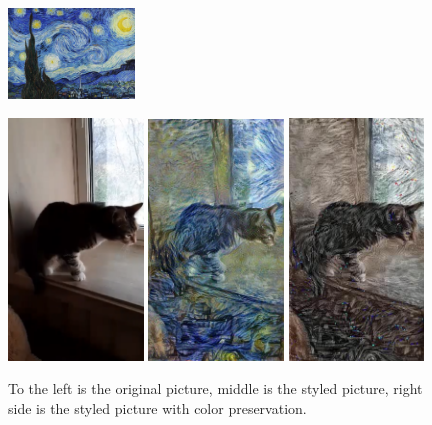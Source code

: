 \begin{figure}[!ht]

\begin{center}
\includegraphics[width=0.3\textwidth]{report/Method/images/style_starry_night.jpg}

\includegraphics[width=0.32\textwidth]{report/Method/images/original_cat.png}
\includegraphics[width=0.32\textwidth]{report/Method/images/styled_cat.png}
\includegraphics[width=0.32\textwidth]{report/Method/images/color_preserved.png}
\caption{To the left is the original picture, middle is the styled picture, right side is the styled picture with color preservation.}
\label{fig:color_preserved_cat}
\end{center}

\end{figure}
\newpage



